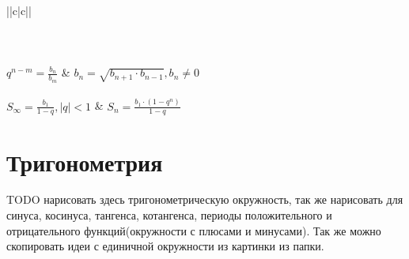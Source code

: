 \begin{tabu}[t]{||c|c||}
	\hline	
		 \\
	\hline
		 \\
		 \\
	\hline
		 \\
	\hline
		$\displaystyle q^{n-m} = \frac{b_n}{b_m} $ &
		$\displaystyle b_n = \sqrt{b_{n+1}\cdot b_{n-1}}, b_n \neq 0 $ \\
	\hline
		 \\
	\hline
		$\displaystyle S_\infty = \frac{b_1}{1-q}, \left|q\right| < 1 $ &
		$\displaystyle S_n  = \frac{b_1\cdot (1 - q^n)}{1-q} $ \\
	\hline
\end{tabu}


\section{Тригонометрия}

TODO нарисовать здесь тригонометрическую окружность, так же нарисовать для синуса, косинуса, тангенса, котангенса, периоды положительного и отрицательного функций(окружности с плюсами и минусами). Так же можно скопировать идеи с единичной окружности из картинки из папки.

